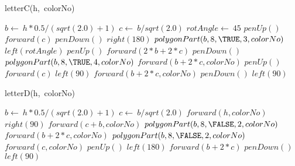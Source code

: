 \documentclass[a4paper,10pt]{article}
\begin{document}
\begin{algorithm}
\caption{letterC(h,\ colorNo)}
\begin{algorithmic}[5]

\STATE {}
\STATE {}
  \STATE \(b\gets\ h*0.5/(sqrt(2.0)+1)\)
  \STATE \(c\gets\ b/sqrt(2.0)\)
  \STATE \(rotAngle\gets\ 45\)
  \STATE \(penUp()\)
  \STATE \(forward(c)\)
  \STATE \(penDown()\)
  \STATE \(right(180)\)
  \STATE {}
  \STATE {}
  \STATE \(polygonPart(b,8,\TRUE,3,colorNo)\)
  \STATE \(left(rotAngle)\)
  \STATE \(penUp()\)
  \STATE \(forward(2*b+2*c)\)
  \STATE \(penDown()\)
  \STATE {}
  \STATE {}
  \STATE \(polygonPart(b,8,\TRUE,4,colorNo)\)
  \STATE \(forward(b+2*c,colorNo)\)
  \STATE \(penUp()\)
  \STATE \(forward(c)\)
  \STATE \(left(90)\)
  \STATE \(forward(b+2*c,colorNo)\)
  \STATE \(penDown()\)
  \STATE \(left(90)\)

\end{algorithmic}
\end{algorithm}


\begin{algorithm}
\caption{letterD(h,\ colorNo)}
\begin{algorithmic}[5]

\STATE {}
\STATE {}
  \STATE \(b\gets\ h*0.5/(sqrt(2.0)+1)\)
  \STATE \(c\gets\ b/sqrt(2.0)\)
  \STATE \(forward(h,colorNo)\)
  \STATE \(right(90)\)
  \STATE \(forward(c+b,colorNo)\)
  \STATE {}
  \STATE {}
  \STATE \(polygonPart(b,8,\FALSE,2,colorNo)\)
  \STATE \(forward(b+2*c,colorNo)\)
  \STATE {}
  \STATE {}
  \STATE \(polygonPart(b,8,\FALSE,2,colorNo)\)
  \STATE \(forward(c,colorNo)\)
  \STATE \(penUp()\)
  \STATE \(left(180)\)
  \STATE \(forward(b+2*c)\)
  \STATE \(penDown()\)
  \STATE \(left(90)\)

\end{algorithmic}
\end{algorithm}
\end{document}

